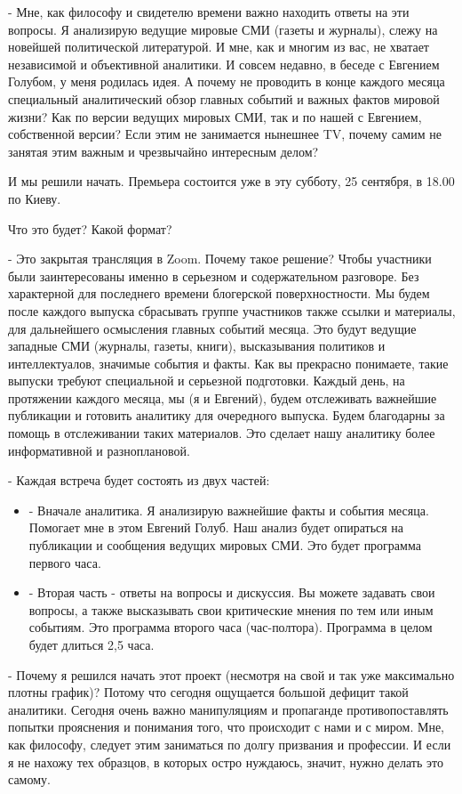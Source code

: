 - Мне, как философу и свидетелю времени важно находить ответы на эти вопросы. Я
анализирую ведущие мировые СМИ (газеты и журналы), слежу на новейшей
политической литературой. И мне, как и многим из вас, не хватает независимой и
объективной аналитики. И совсем недавно, в беседе с Евгением Голубом, у меня
родилась идея. А почему не проводить в конце каждого месяца специальный
аналитический обзор главных событий и важных фактов мировой жизни? Как по
версии ведущих мировых СМИ, так и по нашей с Евгением, собственной версии? Если
этим не занимается нынешнее TV, почему самим не занятая этим важным и
чрезвычайно интересным делом? 

И мы решили начать. Премьера состоится уже в эту субботу, 25 сентября, в 18.00
по Киеву. 

Что это будет? Какой формат? 

- Это закрытая трансляция в Zoom. Почему такое решение? Чтобы участники были
заинтересованы именно в серьезном и содержательном разговоре. Без характерной
для последнего времени блогерской поверхностности. Мы будем после каждого
выпуска сбрасывать группе участников также ссылки и материалы, для дальнейшего
осмысления главных событий месяца. Это будут ведущие западные СМИ (журналы,
газеты, книги), высказывания политиков и интеллектуалов, значимые события и
факты. Как вы прекрасно понимаете, такие выпуски требуют специальной и
серьезной подготовки. Каждый день, на протяжении каждого месяца, мы (я и
Евгений), будем отслеживать важнейшие публикации и готовить аналитику для
очередного выпуска. Будем благодарны за помощь в отслеживании таких материалов.
Это сделает нашу аналитику более информативной и разноплановой. 

- Каждая встреча будет состоять из двух частей:

\begin{itemize} %
\item - Вначале аналитика. Я анализирую важнейшие факты и события месяца.
Помогает мне в этом Евгений Голуб. Наш анализ будет опираться на публикации
и сообщения ведущих мировых СМИ. Это будет программа первого часа.  

\item - Вторая часть - ответы на вопросы и дискуссия. Вы можете задавать свои
вопросы, а также высказывать свои критические мнения по тем или иным
событиям. Это программа второго часа (час-полтора). Программа в целом будет
длиться 2,5 часа. 
\end{itemize} %

- Почему я решился начать этот проект (несмотря на свой и так уже максимально
плотны график)? Потому что сегодня ощущается большой дефицит такой аналитики.
Сегодня очень важно манипуляциям и пропаганде противопоставлять попытки
прояснения и понимания того, что происходит с нами и с миром. Мне, как
философу, следует этим заниматься по долгу призвания и профессии. И если я не
нахожу тех образцов, в которых остро нуждаюсь, значит, нужно делать это самому.

